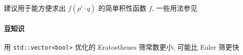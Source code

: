 建议用于能方便求出 \(f(p^i\cdot q)\) 的简单积性函数 \(f\), 一些用法参见 

\paragraph{豆知识} 用 \verb|std::vector<bool>| 优化的 Eratosthenes 筛常数更小, 可能比 Euler 筛更快
